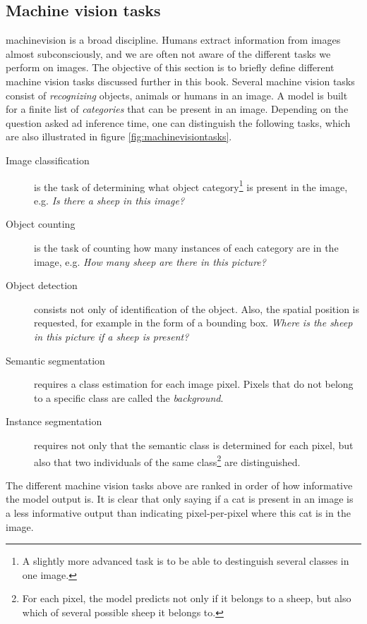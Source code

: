 \subsection{Machine vision tasks \label{sec:machinevisiontasks}}
\par{
    \Gls{machinevision} is a broad discipline. 
    Humans extract information from images almost subconsciously, and we are often not aware of the different tasks we perform on images.
    The objective of this section is to briefly define different machine vision tasks discussed further in this book. 
    Several machine vision tasks consist of \textit{recognizing} objects, animals or humans in an image.
    A model is built for a finite list of \textit{categories} that can be present in an image.
    Depending on the question asked ad inference time, one can distinguish the following tasks, which are also illustrated in figure \ref{fig:machinevisiontasks}.
}
\begin{description}
    \item[Image classification] is the task of determining what object category\footnote{A slightly more advanced task is to be able to destinguish several classes in one image.} is present in the image, e.g. \textit{Is there a sheep in this image?}
    \item[Object counting] is the task of counting how many instances of each category are in the image, e.g. \textit{How many sheep are there in this picture?} 
    \item[Object detection] consists not only of identification of the object. Also, the spatial position is requested, for example in the form of a bounding box. \textit{Where is the sheep in this picture if a sheep is present?}
    \item[Semantic segmentation] requires a class estimation for each image pixel. Pixels that do not belong to a specific class are called the \textit{background}.
    \item[Instance segmentation] requires not only that the semantic class is determined for each pixel, but also that two individuals of the same class\footnote{For each pixel, the model predicts not only if it belongs to a sheep, but also which of several possible sheep it belongs to.} are distinguished.   
\end{description}
\par{
    The different machine vision tasks above are ranked in order of how informative the model output is.
    It is clear that only saying if a cat is present in an image is a less informative output than indicating pixel-per-pixel where this cat is in the image.
}
